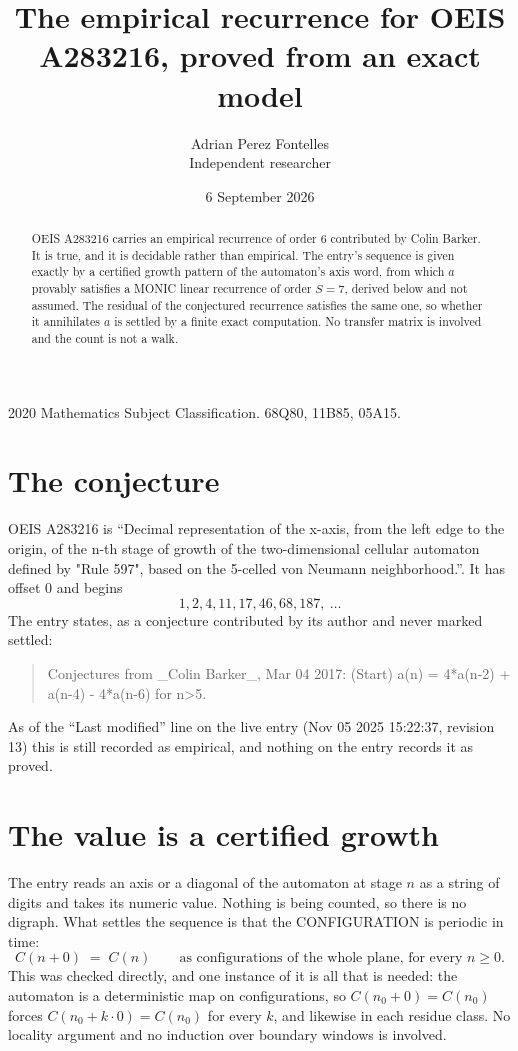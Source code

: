 \documentclass[11pt,a4paper]{article}
\title{The empirical recurrence for OEIS A283216, proved from an exact model}
\author{Adrian Perez Fontelles\\ \small Independent researcher}
\date{6 September 2026}
\theoremstyle{plain}
\theoremstyle{definition}
\begin{document}
\maketitle

\begin{abstract}
OEIS A283216 carries an empirical recurrence of order $6$ contributed by Colin Barker. It is true, and it is
decidable rather than empirical. The entry's sequence is given exactly by a certified growth pattern of the automaton's axis word, from
which $a$ provably satisfies a MONIC linear recurrence of order $S=7$, derived below and not
assumed. The residual of the conjectured recurrence satisfies the same one, so whether it
annihilates $a$ is settled by a finite exact computation. No transfer matrix is involved and
the count is not a walk.
\end{abstract}

\noindent\small 2020 Mathematics Subject Classification. 68Q80, 11B85, 05A15.\normalsize

\section{The conjecture}

OEIS A283216 is ``Decimal representation of the x-axis, from the left edge to the origin, of the n-th stage of growth of the two-dimensional cellular automaton defined by "Rule 597", based on the 5-celled von Neumann neighborhood.''. It has offset $0$ and begins
\[
1, 2, 4, 11, 17, 46, 68, 187,\ \dots
\]
The entry states, as a conjecture contributed by its author and never marked settled:
\begin{quote}
Conjectures from \_Colin Barker\_, Mar 04 2017: (Start) a(n) = 4*a(n-2) + a(n-4) - 4*a(n-6) for n>5.
\end{quote}
As of the ``Last modified'' line on the live entry (Nov 05 2025 15:22:37, revision 13)
this is still recorded as empirical, and nothing on the entry records it as proved.

\section{The value is a certified growth}

The entry reads an axis or a diagonal of the automaton at stage $n$ as a string of digits and
takes its numeric value. Nothing is being counted, so there is no digraph. What settles the
sequence is that the CONFIGURATION is periodic in time:
\[
C(n+0)\;=\;C(n)\qquad\text{as configurations of the whole plane, for every } n\ge 0.
\]
This was checked directly, and one instance of it is all that is needed: the automaton is a
deterministic map on configurations, so $C(n_0+0)=C(n_0)$ forces $C(n_0+k\cdot0)=C(n_0)$ for
every $k$, and likewise in each residue class. No locality argument and no induction over
boundary windows is involved.
\end{document}
